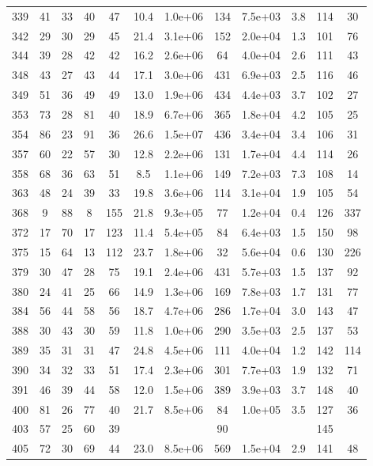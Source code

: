 \begin{table}
\begin{tabular}{cccccccccccc}
339 & 41 & 33 & 40 & 47 & 10.4 & 1.0e+06 & 134 & 7.5e+03 & 3.8 & 114 & 30 \\
342 & 29 & 30 & 29 & 45 & 21.4 & 3.1e+06 & 152 & 2.0e+04 & 1.3 & 101 & 76 \\
344 & 39 & 28 & 42 & 42 & 16.2 & 2.6e+06 & 64 & 4.0e+04 & 2.6 & 111 & 43 \\
348 & 43 & 27 & 43 & 44 & 17.1 & 3.0e+06 & 431 & 6.9e+03 & 2.5 & 116 & 46 \\
349 & 51 & 36 & 49 & 49 & 13.0 & 1.9e+06 & 434 & 4.4e+03 & 3.7 & 102 & 27 \\
353 & 73 & 28 & 81 & 40 & 18.9 & 6.7e+06 & 365 & 1.8e+04 & 4.2 & 105 & 25 \\
354 & 86 & 23 & 91 & 36 & 26.6 & 1.5e+07 & 436 & 3.4e+04 & 3.4 & 106 & 31 \\
357 & 60 & 22 & 57 & 30 & 12.8 & 2.2e+06 & 131 & 1.7e+04 & 4.4 & 114 & 26 \\
358 & 68 & 36 & 63 & 51 & 8.5 & 1.1e+06 & 149 & 7.2e+03 & 7.3 & 108 & 14 \\
363 & 48 & 24 & 39 & 33 & 19.8 & 3.6e+06 & 114 & 3.1e+04 & 1.9 & 105 & 54 \\
368 & 9 & 88 & 8 & 155 & 21.8 & 9.3e+05 & 77 & 1.2e+04 & 0.4 & 126 & 337 \\
372 & 17 & 70 & 17 & 123 & 11.4 & 5.4e+05 & 84 & 6.4e+03 & 1.5 & 150 & 98 \\
375 & 15 & 64 & 13 & 112 & 23.7 & 1.8e+06 & 32 & 5.6e+04 & 0.6 & 130 & 226 \\
379 & 30 & 47 & 28 & 75 & 19.1 & 2.4e+06 & 431 & 5.7e+03 & 1.5 & 137 & 92 \\
380 & 24 & 41 & 25 & 66 & 14.9 & 1.3e+06 & 169 & 7.8e+03 & 1.7 & 131 & 77 \\
384 & 56 & 44 & 58 & 56 & 18.7 & 4.7e+06 & 286 & 1.7e+04 & 3.0 & 143 & 47 \\
388 & 30 & 43 & 30 & 59 & 11.8 & 1.0e+06 & 290 & 3.5e+03 & 2.5 & 137 & 53 \\
389 & 35 & 31 & 31 & 47 & 24.8 & 4.5e+06 & 111 & 4.0e+04 & 1.2 & 142 & 114 \\
390 & 34 & 32 & 33 & 51 & 17.4 & 2.3e+06 & 301 & 7.7e+03 & 1.9 & 132 & 71 \\
391 & 46 & 39 & 44 & 58 & 12.0 & 1.5e+06 & 389 & 3.9e+03 & 3.7 & 148 & 40 \\
400 & 81 & 26 & 77 & 40 & 21.7 & 8.5e+06 & 84 & 1.0e+05 & 3.5 & 127 & 36 \\
403 & 57 & 25 & 60 & 39 &  &  & 90 &  &  & 145 &  \\
405 & 72 & 30 & 69 & 44 & 23.0 & 8.5e+06 & 569 & 1.5e+04 & 2.9 & 141 & 48 \\

\end{tabular}
\end{table}
